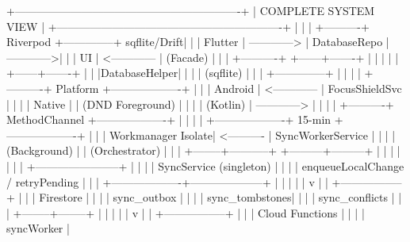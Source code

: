 \documentclass[12pt,a4paper,openany]{report}
\begin{document}
\begin{blockverbatim}
+-------------------------------------------------------------+
|                     COMPLETE SYSTEM VIEW                    |
+-------------------------------------------------------------+
|                                                             |
|  +----------+    Riverpod     +--------------+ sqflite/Drift|
|  |  Flutter  | ------------>  | DatabaseRepo | ------------>|
|  |   UI     | <------------  |  (Facade)    |              |
|  +----------+                 +------+-------+              |
|                                      |                       |
|                               +------+-------+               |
|                               |DatabaseHelper|               |
|                               |   (sqflite)  |               |
|                               +--------------+               |
|                                                               |
|  +----------+    Platform     +-------------------+          |
|  | Android  | <------------  | FocusShieldSvc    |          |
|  | Native   |                | (DND Foreground)  |          |
|  | (Kotlin) | ------------>  |                   |          |
|  +----------+  MethodChannel +-------------------+          |
|                                                               |
|  +-------------------+    15-min     +-------------------+     |
|  | Workmanager Isolate| <----------  | SyncWorkerService |     |
|  |  (Background)      |              |  (Orchestrator)   |     |
|  +--------+-----------+             +---------+---------+     |
|           |                                  |                 |
|           |         +-----------------------+                 |
|           |         |      SyncService (singleton)            |
|           |         | enqueueLocalChange / retryPending        |
|           |         +-------------------+--------------------+
|           |                             |
|           |                             v
|           |                    +-----------------+
|           |                    |   Firestore     |
|           |                    |  sync_outbox    |
|           |                    |  sync_tombstones|
|           |                    |  sync_conflicts |
|           |                    +--------+--------+
|           |                             |
|           |                             v
|           |                    +-----------------+
|           |                    | Cloud Functions |
|           |                    | syncWorker      |

\end{blockverbatim}
\end{document}
